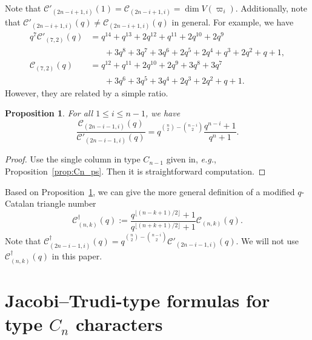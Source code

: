 \documentclass[11pt, leqno]{amsart}
\theoremstyle{plain}
\newtheorem{proposition}[theorem]{Proposition}
\theoremstyle{definition}
\numberwithin{equation}{section}
\newcommand{\fw}{\varpi} %
\newcommand{\seteq}{\mathbin{:=}}
\newcommand{\Cat}{\mathcal{C}} %
\newcommand{\CatCR}{\widetilde{\Cat}} %
\begin{document}
Note that $\Cat'_{(2n-i+1,i)}(1) = \Cat_{(2n-i+1,i)} = \dim V(\fw_i)$.
Additionally, note that $\Cat'_{(2n-i+1,i)}(q) \neq \Cat_{(2n-i+1,i)}(q)$ in general.
For example, we have
\begin{align*}
q^7 \Cat'_{(7,2)}(q) & = q^{14} + q^{13} + 2 q^{12} + q^{11} + 2 q^{10} + 2 q^9
\\ & \hspace{20pt} + 3 q^8 + 3 q^7 + 3 q^6 + 2 q^5 + 2 q^4 + q^3 + 2 q^2 + q + 1,
\\ \Cat_{(7,2)}(q) & = q^{12} + q^{11} + 2 q^{10} + 2 q^9 + 3 q^8 + 3 q^7
\\ & \hspace{20pt} + 3 q^6 + 3 q^5 + 3 q^4 + 2 q^3 + 2 q^2 + q + 1.
\end{align*}
However, they are related by a simple ratio.

\begin{proposition}
\label{prop:ratio}
For all $1 \leq i \leq n-1$, we have
\[
\frac{\Cat_{(2n-i-1,i)}(q)}{\Cat'_{(2n-i-1,i)}(q)} = q^{\binom{n}{2} - \binom{n-i}{2}} \frac{q^{n-i} + 1}{q^{n}+1}.
\]
\end{proposition}

\begin{proof}
Use the single column in type $C_{n-1}$ given in, \textit{e.g.}, Proposition~\ref{prop:Cn_ps}.
Then it is straightforward computation.
\end{proof}

Based on Proposition~\ref{prop:ratio}, we can give the more general definition of a modified $q$-Catalan triangle number
\[
\Cat^{\dagger}_{(n,k)}(q) \seteq \frac{q^{\lfloor (n-k+1)/2 \rfloor} + 1}{q^{\lfloor (n+k+1)/2 \rfloor} + 1} \Cat_{(n,k)}(q).
\]
Note that $\Cat^{\dagger}_{(2n-i-1,i)}(q) = q^{\binom{n}{2} - \binom{n-i}{2}} \Cat'_{(2n-i-1,i)}(q)$. We will not use $\Cat^{\dagger}_{(n,k)}(q)$ in this paper.










\section{Jacobi--Trudi-type formulas for type $C_n$ characters}
\label{sec:JT_type_C}
\end{document}
